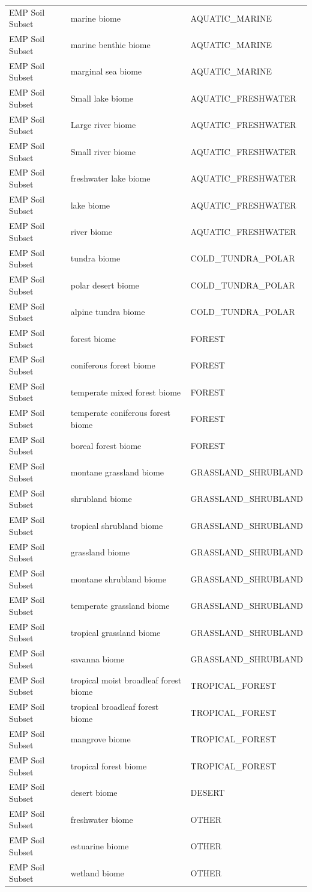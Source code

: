 \documentclass[12pt, oneside]{report}
\begin{document}
\begin{longtable}{llp{5cm}}
EMP Soil Subset & marine biome & AQUATIC\_MARINE \\
EMP Soil Subset & marine benthic biome & AQUATIC\_MARINE \\
EMP Soil Subset & marginal sea biome & AQUATIC\_MARINE \\
EMP Soil Subset & Small lake biome & AQUATIC\_FRESHWATER \\
EMP Soil Subset & Large river biome & AQUATIC\_FRESHWATER \\
EMP Soil Subset & Small river biome & AQUATIC\_FRESHWATER \\
EMP Soil Subset & freshwater lake biome & AQUATIC\_FRESHWATER \\
EMP Soil Subset & lake biome & AQUATIC\_FRESHWATER \\
EMP Soil Subset & river biome & AQUATIC\_FRESHWATER \\
EMP Soil Subset & tundra biome & COLD\_TUNDRA\_POLAR \\
EMP Soil Subset & polar desert biome & COLD\_TUNDRA\_POLAR \\
EMP Soil Subset & alpine tundra biome & COLD\_TUNDRA\_POLAR \\
EMP Soil Subset & forest biome & FOREST \\
EMP Soil Subset & coniferous forest biome & FOREST \\
EMP Soil Subset & temperate mixed forest biome & FOREST \\
EMP Soil Subset & temperate coniferous forest biome & FOREST \\
EMP Soil Subset & boreal forest biome & FOREST \\
EMP Soil Subset & montane grassland biome & GRASSLAND\_SHRUBLAND \\
EMP Soil Subset & shrubland biome & GRASSLAND\_SHRUBLAND \\
EMP Soil Subset & tropical shrubland biome & GRASSLAND\_SHRUBLAND \\
EMP Soil Subset & grassland biome & GRASSLAND\_SHRUBLAND \\
EMP Soil Subset & montane shrubland biome & GRASSLAND\_SHRUBLAND \\
EMP Soil Subset & temperate grassland biome & GRASSLAND\_SHRUBLAND \\
EMP Soil Subset & tropical grassland biome & GRASSLAND\_SHRUBLAND \\
EMP Soil Subset & savanna biome & GRASSLAND\_SHRUBLAND \\
EMP Soil Subset & tropical moist broadleaf forest biome & TROPICAL\_FOREST \\
EMP Soil Subset & tropical broadleaf forest biome & TROPICAL\_FOREST \\
EMP Soil Subset & mangrove biome & TROPICAL\_FOREST \\
EMP Soil Subset & tropical forest biome & TROPICAL\_FOREST \\
EMP Soil Subset & desert biome & DESERT \\
EMP Soil Subset & freshwater biome & OTHER \\
EMP Soil Subset & estuarine biome & OTHER \\
EMP Soil Subset & wetland biome & OTHER \\
\end{longtable}
\endgroup

\end{document}
